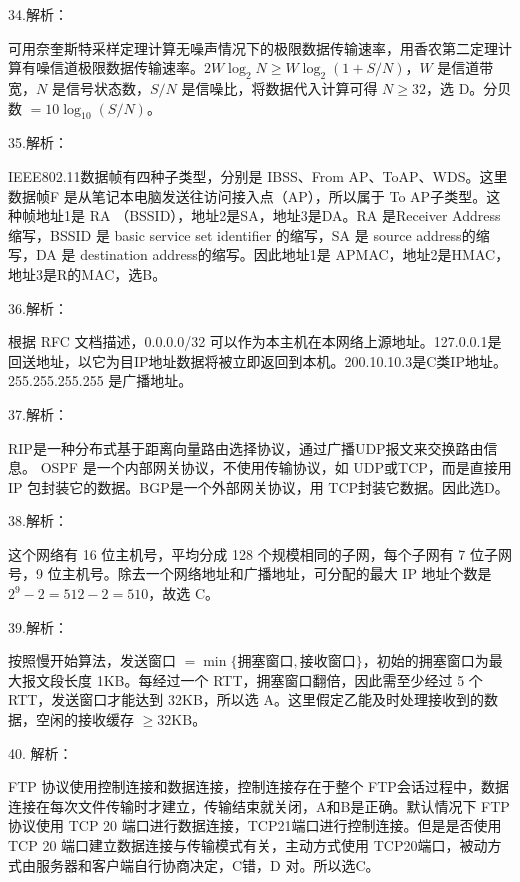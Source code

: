 \documentclass[UTF8,11pt]{ctexart}
\begin{document}
34.解析：


可用奈奎斯特采样定理计算无噪声情况下的极限数据传输速率，用香农第二定理计算有噪信道极限数据传输速率。\(\displaystyle 2W\log_2N\geq W\log_2(1+S/N)\)，\(\displaystyle W\) 是信道带宽，\(\displaystyle N\) 是信号状态数，\(\displaystyle S/N\) 是信噪比，将数据代入计算可得 \(\displaystyle N\geq32\)，选 D。分贝数 \(\displaystyle =10\log_{10}(S/N)\)。


35.解析：


IEEE802.11数据帧有四种子类型，分别是 IBSS、From AP、ToAP、WDS。这里数据帧F 是从笔记本电脑发送往访问接入点（AP），所以属于 To AP子类型。这种帧地址1是 RA （BSSID），地址2是SA，地址3是DA。RA 是Receiver Address 缩写，BSSID 是 basic service set identifier 的缩写，SA 是 source address的缩写，DA 是 destination address的缩写。因此地址1是 APMAC，地址2是HMAC，地址3是R的MAC，选B。


36.解析：


根据 RFC 文档描述，0.0.0.0/32 可以作为本主机在本网络上源地址。127.0.0.1是回送地址，以它为目IP地址数据将被立即返回到本机。200.10.10.3是C类IP地址。255.255.255.255 是广播地址。


37.解析：


RIP是一种分布式基于距离向量路由选择协议，通过广播UDP报文来交换路由信息。 OSPF 是一个内部网关协议，不使用传输协议，如 UDP或TCP，而是直接用 IP 包封装它的数据。BGP是一个外部网关协议，用 TCP封装它数据。因此选D。


38.解析：


这个网络有 16 位主机号，平均分成 128 个规模相同的子网，每个子网有 7 位子网号，9 位主机号。除去一个网络地址和广播地址，可分配的最大 IP 地址个数是 \(\displaystyle 2^9-2=512-2=510\)，故选 C。


39.解析：


按照慢开始算法，发送窗口 \(\displaystyle =\displaystyle \min\{\text{拥塞窗口},\allowbreak \text{接收窗口}\}\)，初始的拥塞窗口为最大报文段长度 1KB。每经过一个 RTT，拥塞窗口翻倍，因此需至少经过 5 个 RTT，发送窗口才能达到 32KB，所以选 A。这里假定乙能及时处理接收到的数据，空闲的接收缓存 \(\displaystyle \geq32\mathrm{KB}\)。


40. 解析：


FTP 协议使用控制连接和数据连接，控制连接存在于整个 FTP会话过程中，数据连接在每次文件传输时才建立，传输结束就关闭，A和B是正确。默认情况下 FTP 协议使用 TCP 20 端口进行数据连接，TCP21端口进行控制连接。但是是否使用 TCP 20 端口建立数据连接与传输模式有关，主动方式使用 TCP20端口，被动方式由服务器和客户端自行协商决定，C错，D 对。所以选C。
\end{document}

